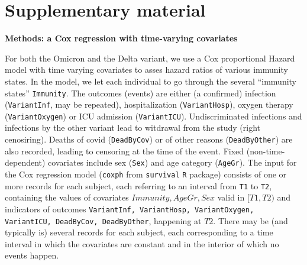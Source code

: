\documentclass[preprint,12pt,authoryear]{elsarticle}
\begin{document}





\newpage

\section*{Supplementary material}

\setcounter{table}{0}
\renewcommand{\thetable}{S\arabic{table}}
\setcounter{figure}{0}
\renewcommand{\thefigure}{S\arabic{figure}}



\noindent
{\bf Methods: a Cox regression with time-varying covariates}

For both the Omicron and the Delta variant, we use a Cox proportional Hazard model with time varying covariates to asses hazard ratios of various immunity states. In the model,
we let each individual to go through the several ``immunity states'' {\tt Immunity}. The outcomes (events) are either (a confirmed) infection ({\tt VariantInf}, may be repeated), hospitalization ({\tt VariantHosp}), oxygen therapy ({\tt VariantOxygen}) or ICU admission ({\tt VariantICU}). Undiscriminated infections and infections by the other variant lead to witdrawal from the study (right cenosiring). 
Deaths of covid ({\tt DeadByCov}) or of other reasons ({\tt DeadByOther}) are also recorded, leading to censoring at the time of the event. Fixed (non-time-dependent) covariates include sex ({\tt Sex}) and age category ({\tt AgeGr}). The input for the Cox regression model ({\tt coxph} from {\tt survival} {\tt R} package) consists of one or more records for each subject, each referring to an interval from {\tt T1} to {\tt T2}, containing the values of covariates $Immunity,AgeGr,Sex$ valid in $[T1,T2)$ and indicators of outcomes {\tt VariantInf, VariantHosp, VariantOxygen, VariantICU, DeadByCov, DeadByOther}, happening at $T2$. There may be (and typically is) several records for each subject, each corresponding to a time interval in which the covariates are constant and in the interior of which no events happen.
\end{document}
